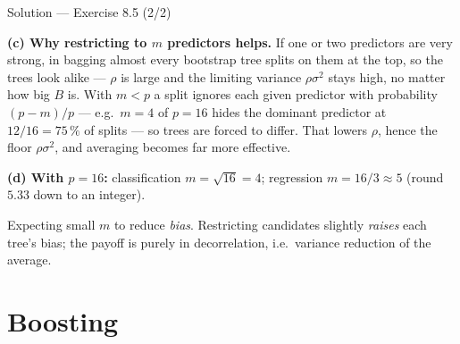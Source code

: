 \documentclass[aspectratio=169,11pt]{beamer}
\begin{document}
\begin{frame}{Solution --- Exercise 8.5 (2/2)}
\begin{solutionbox}
\textbf{(c) Why restricting to $m$ predictors helps.} If one or two predictors are very strong, in bagging almost every bootstrap tree splits on them at the top, so the trees look alike --- $\rho$ is large and the limiting variance $\rho\sigma^2$ stays high, no matter how big $B$ is. With $m<p$ a split ignores each given predictor with probability $(p-m)/p$ --- e.g.\ $m=4$ of $p=16$ hides the dominant predictor at $12/16=75\,\%$ of splits --- so trees are forced to differ. That lowers $\rho$, hence the floor $\rho\sigma^2$, and averaging becomes far more effective.

\medskip
\textbf{(d) With $p=16$:} classification $m=\sqrt{16}=4$; regression $m=16/3\approx 5$ (round $5.33$ down to an integer).
\end{solutionbox}
\begin{mistake}
Expecting small $m$ to reduce \emph{bias}. Restricting candidates slightly \emph{raises} each tree's bias; the payoff is purely in decorrelation, i.e.\ variance reduction of the average.
\end{mistake}
\end{frame}


\section{Boosting}
\end{document}
